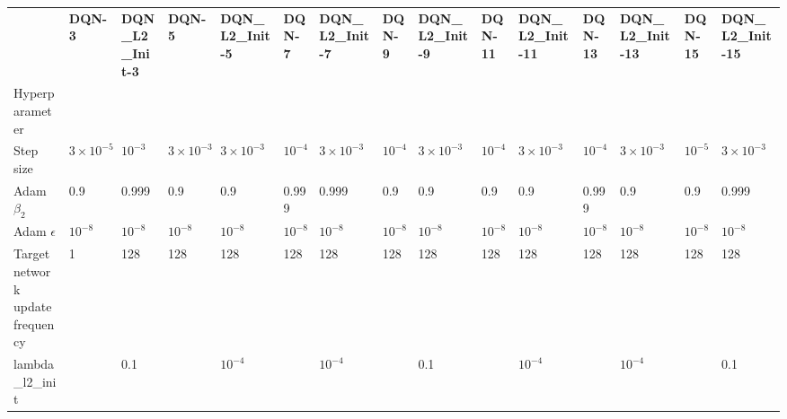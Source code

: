 \begin{tabular}{lllllllllllllll}
 & \bfseries DQN-3 & \bfseries DQN_L2_Init-3 & \bfseries DQN-5 & \bfseries DQN_L2_Init-5 & \bfseries DQN-7 & \bfseries DQN_L2_Init-7 & \bfseries DQN-9 & \bfseries DQN_L2_Init-9 & \bfseries DQN-11 & \bfseries DQN_L2_Init-11 & \bfseries DQN-13 & \bfseries DQN_L2_Init-13 & \bfseries DQN-15 & \bfseries DQN_L2_Init-15 \\
Hyperparameter &  &  &  &  &  &  &  &  &  &  &  &  &  &  \\
Step size & $3 \times 10^{-5}$ & $10^{-3}$ & $3 \times 10^{-3}$ & $3 \times 10^{-3}$ & $10^{-4}$ & $3 \times 10^{-3}$ & $10^{-4}$ & $3 \times 10^{-3}$ & $10^{-4}$ & $3 \times 10^{-3}$ & $10^{-4}$ & $3 \times 10^{-3}$ & $10^{-5}$ & $3 \times 10^{-3}$ \\
Adam $\beta_2$ & 0.9 & 0.999 & 0.9 & 0.9 & 0.999 & 0.999 & 0.9 & 0.9 & 0.9 & 0.9 & 0.999 & 0.9 & 0.9 & 0.999 \\
Adam $\epsilon$ & $10^{-8}$ & $10^{-8}$ & $10^{-8}$ & $10^{-8}$ & $10^{-8}$ & $10^{-8}$ & $10^{-8}$ & $10^{-8}$ & $10^{-8}$ & $10^{-8}$ & $10^{-8}$ & $10^{-8}$ & $10^{-8}$ & $10^{-8}$ \\
Target network update frequency & 1 & 128 & 128 & 128 & 128 & 128 & 128 & 128 & 128 & 128 & 128 & 128 & 128 & 128 \\
lambda_l2_init &  & 0.1 &  & $10^{-4}$ &  & $10^{-4}$ &  & 0.1 &  & $10^{-4}$ &  & $10^{-4}$ &  & 0.1 \\
\end{tabular}
